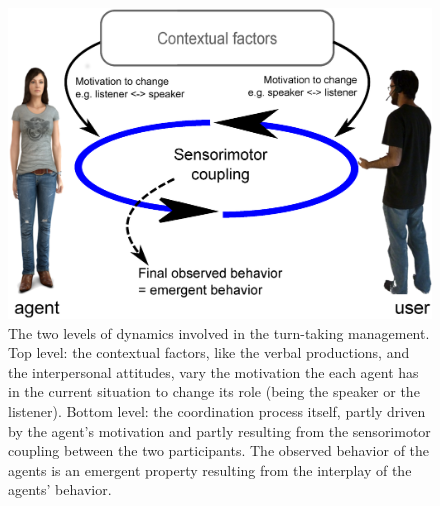 \begin{figure}
  \centering
  \includegraphics[width=\linewidth]{figure/schema_motivation.eps}

  \caption{The two levels of dynamics involved in the turn-taking management. 
    Top level: the contextual factors, like the verbal productions, and the interpersonal attitudes, vary the motivation the each agent has in the current situation to change its role (being the speaker or the listener). 
Bottom level: the coordination process itself, partly driven by the agent's motivation and partly resulting from the sensorimotor coupling between the two participants. 
The observed behavior of the agents is an emergent property resulting from the interplay of the agents' behavior.}
  \label{fig:mot}
\end{figure}

